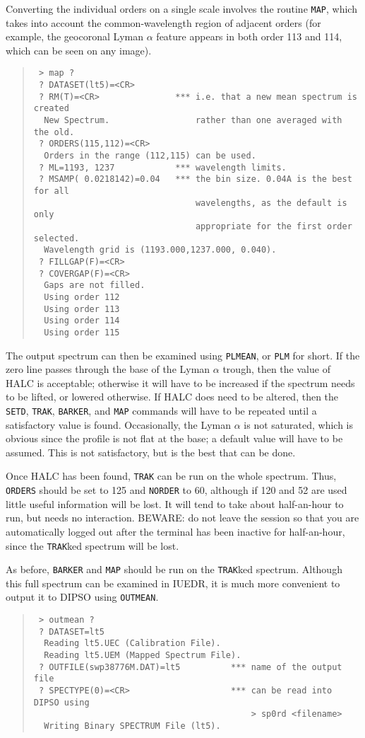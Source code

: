 Converting the individual orders on a single scale involves the
routine {\tt MAP}, which takes into account the common-wavelength region of
adjacent orders (for example, the geocoronal Lyman $\alpha$ feature appears in
both order 113 and 114, which can be seen on any image). 
\begin{quote}
\begin{verbatim}
 > map ?
 ? DATASET(lt5)=<CR>          
 ? RM(T)=<CR>               *** i.e. that a new mean spectrum is created
  New Spectrum.                 rather than one averaged with the old. 
 ? ORDERS(115,112)=<CR>
  Orders in the range (112,115) can be used.
 ? ML=1193, 1237            *** wavelength limits. 
 ? MSAMP( 0.0218142)=0.04   *** the bin size. 0.04A is the best for all 
                                wavelengths, as the default is only
                                appropriate for the first order selected. 
  Wavelength grid is (1193.000,1237.000, 0.040).
 ? FILLGAP(F)=<CR>
 ? COVERGAP(F)=<CR>
  Gaps are not filled.
  Using order 112
  Using order 113
  Using order 114
  Using order 115
\end{verbatim}
\end{quote}
The output spectrum can then be examined using {\tt PLMEAN}, or {\tt PLM} for
short. If the zero line passes through the base of the Lyman $\alpha$ trough, 
then the value of HALC is acceptable; otherwise it will have to be increased
if the spectrum needs to be lifted, or lowered otherwise. If HALC does need 
to be altered, then the {\tt SETD}, {\tt TRAK}, {\tt BARKER}, and {\tt MAP}
commands will have to be repeated until a satisfactory value is found. 
Occasionally, the Lyman $\alpha$ is not saturated, which is obvious since the
profile is not flat at the base; a default value will have to be assumed. This
is not satisfactory, but is the best that can be done. 

Once HALC has been found, {\tt TRAK} can be run on the whole spectrum. 
Thus, {\tt ORDERS} should be set to 125 and {\tt NORDER} to 60, although if
120 and 52 are used little useful information will be lost. It will tend
to take about half-an-hour to run, but needs no interaction.
BEWARE: do not leave the session so that you are automatically logged 
out after the terminal has been inactive for half-an-hour, since the 
{\tt TRAK}ked spectrum will be lost. 

As before, {\tt BARKER} and {\tt MAP} should be run on the {\tt TRAK}ked 
spectrum. Although this full spectrum can be examined in IUEDR, it is much 
more convenient to output it to DIPSO using {\tt OUTMEAN}.
\begin{quote}
\begin{verbatim}
 > outmean ?
 ? DATASET=lt5
  Reading lt5.UEC (Calibration File).
  Reading lt5.UEM (Mapped Spectrum File).
 ? OUTFILE(swp38776M.DAT)=lt5          *** name of the output file
 ? SPECTYPE(0)=<CR>                    *** can be read into DIPSO using
                                           > sp0rd <filename>
  Writing Binary SPECTRUM File (lt5).         
\end{verbatim}
\end{quote}

